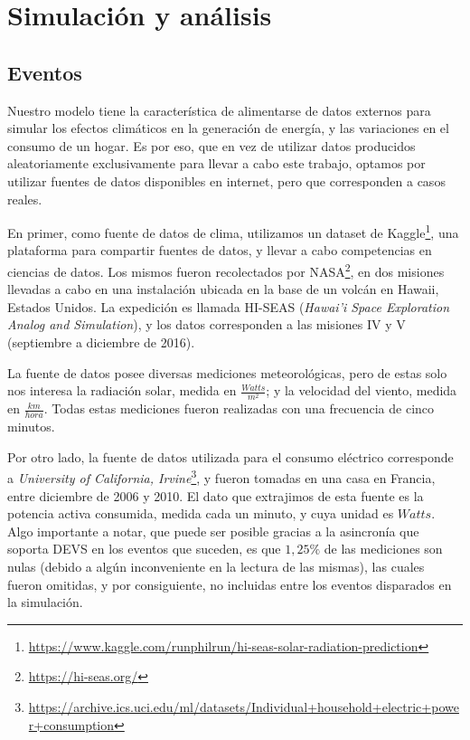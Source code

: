 
\section{Simulación y análisis}

\subsection{Eventos}
Nuestro modelo tiene la característica de alimentarse de
datos externos para simular los efectos climáticos en la generación de
energía, y las variaciones en el consumo de un hogar. Es por eso, que en vez
de utilizar datos producidos aleatoriamente exclusivamente para llevar a cabo
este trabajo, optamos por utilizar fuentes de datos disponibles en internet,
pero que corresponden a casos reales.

En primer, como fuente de datos de clima, utilizamos un dataset de
Kaggle\footnote{\url{https://www.kaggle.com/runphilrun/hi-seas-solar-radiation-prediction}},
una plataforma para compartir fuentes de datos, y llevar a cabo
competencias en ciencias de datos. Los mismos fueron recolectados por
NASA\footnote{\url{https://hi-seas.org/}}, en dos misiones llevadas a cabo en
una instalación ubicada en la base de un volcán en Hawaii, Estados Unidos. La
expedición es llamada HI-SEAS (\textit{Hawai’i Space Exploration Analog and
Simulation}), y los datos corresponden a las misiones IV y V (septiembre a
diciembre de 2016).

La fuente de datos posee diversas mediciones meteorológicas, pero de estas
solo nos interesa la radiación solar, medida en $\frac{Watts}{m^2}$; y la
velocidad del viento, medida en $\frac{km}{hora}$. Todas estas mediciones
fueron realizadas con una frecuencia de cinco minutos.

Por otro lado, la fuente de datos utilizada para el consumo eléctrico
corresponde a \textit{University of California,
Irvine}\footnote{\url{https://archive.ics.uci.edu/ml/datasets/Individual+household+electric+power+consumption}},
y fueron tomadas en una casa en Francia, entre diciembre de 2006 y 2010. El
dato que extrajimos de esta fuente es la potencia activa consumida, medida
cada un minuto, y cuya unidad es $Watts$. Algo importante a notar, que puede
ser posible gracias a la asincronía que soporta DEVS en los eventos que
suceden, es que $1,25\%$ de las mediciones son nulas (debido a algún
inconveniente en la lectura de las mismas), las cuales fueron omitidas, y por
consiguiente, no incluidas entre los eventos disparados en la simulación.

